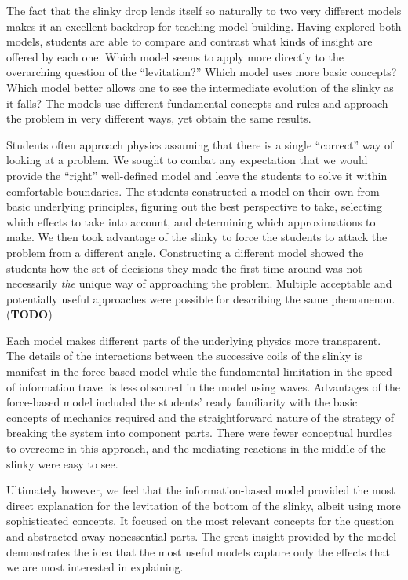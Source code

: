 \documentclass[prb,preprint]{revtex4-1}
\newcommand{\TODO}[1]{\marginpar{\raggedright\scriptsize\textbf{TODO:} #1} (\textbf{TODO})}
\newcommand{\calvin}[2]{\textcolor{purple}{\sout{#1}#2}}
\begin{document}
The fact that the slinky drop lends itself so naturally to two very different models
makes it an excellent backdrop for teaching model building. Having explored both
models, students are able to compare and contrast what kinds of insight are
offered by each one. Which model seems to apply more directly to the overarching
question of the ``levitation?'' Which model uses more basic concepts? Which model
better allows one to see the intermediate evolution of the slinky as it falls?
The models use different fundamental concepts and rules and approach
the problem in very different ways, yet obtain the same results.

Students often approach physics assuming that there is a single ``correct'' way
of looking at a problem. We sought to combat any expectation that we would
provide the ``right'' well-defined model and leave the students to solve it within
comfortable boundaries.
The students constructed a model on their own from basic underlying
principles, figuring out the best perspective to take, selecting which effects
to take into account, and determining which approximations to make.
We then took advantage of the slinky to force the students to attack the problem
from a different angle. Constructing a different model showed the students
how the set of decisions they made the first time around was not necessarily
\emph{the} unique way of approaching the problem. Multiple acceptable and potentially
useful approaches were possible for describing the same phenomenon.
\TODO{\calvin{}{Lots of references are warranted in this paragraph.}}

Each model makes different parts of the underlying physics
more transparent. The details of the interactions between the successive coils
of the slinky is manifest in the force-based model while the fundamental
limitation in the speed of information travel is less obscured in the model
using waves. Advantages of the force-based model included the students' ready
familiarity with the basic concepts of mechanics required and the straightforward
nature of the strategy of breaking the system into component parts. There were
fewer conceptual hurdles to overcome in this approach, and the mediating
reactions in the middle of the slinky were easy to see. 

Ultimately however, we feel that the information-based model provided the
most direct explanation for the levitation of the bottom of the slinky, albeit
using more sophisticated concepts. It focused
on the most relevant concepts for the question and abstracted away
nonessential parts. The great insight provided by the
model demonstrates the idea that the most useful models
capture only the effects that we are most interested in explaining.
\end{document}
